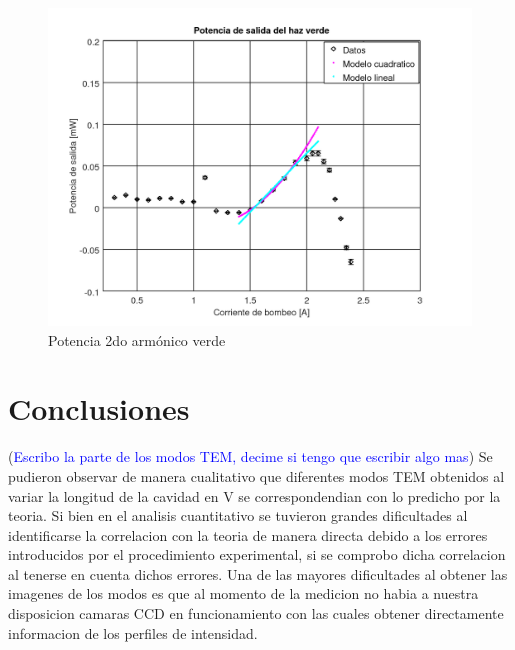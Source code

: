 \documentclass[10pt, a4paper]{article}%
\begin{document}
\begin{multicols}{2}
\begin{figure}[H]
    \centering
    \includegraphics[scale=0.4]{Graficos/pot_verde1.png}
    \caption{Potencia 2do armónico verde}
    \label{potverde}
\end{figure}




\section{Conclusiones}

(\textcolor{Blue}{Escribo la parte de los modos TEM, decime si tengo que escribir algo mas})
Se pudieron observar de manera cualitativo que diferentes modos TEM obtenidos al variar la longitud de la cavidad en V se correspondendian con lo predicho por la teoria. Si bien en el analisis cuantitativo se tuvieron grandes dificultades al identificarse la correlacion con la teoria de manera directa debido a los errores introducidos por el procedimiento experimental, si se comprobo dicha correlacion al tenerse en cuenta dichos errores. Una de las mayores dificultades al obtener las imagenes de los modos es que al momento de la medicion no habia a nuestra disposicion camaras CCD en funcionamiento con las cuales obtener directamente informacion de los perfiles de intensidad.



\begin{thebibliography}{100}
\end{thebibliography}
\end{multicols}
\end{document}
